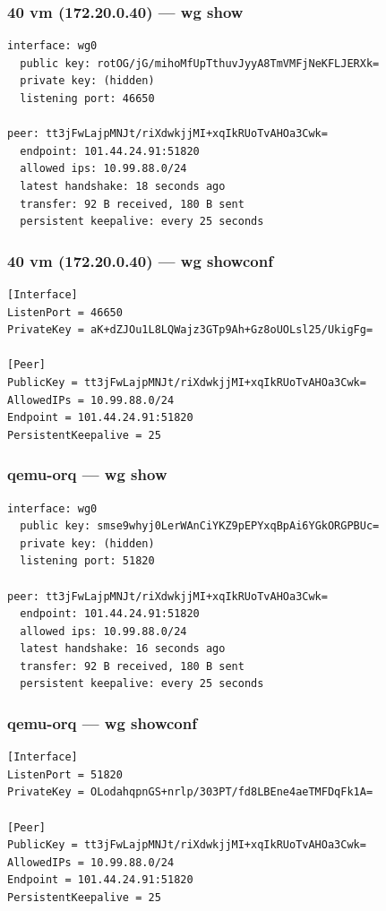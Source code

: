 \documentclass[11pt,a4paper]{article}
\begin{document}
\subsubsection*{40 vm (172.20.0.40) — wg show}
\begin{lstlisting}
interface: wg0
  public key: rotOG/jG/mihoMfUpTthuvJyyA8TmVMFjNeKFLJERXk=
  private key: (hidden)
  listening port: 46650

peer: tt3jFwLajpMNJt/riXdwkjjMI+xqIkRUoTvAHOa3Cwk=
  endpoint: 101.44.24.91:51820
  allowed ips: 10.99.88.0/24
  latest handshake: 18 seconds ago
  transfer: 92 B received, 180 B sent
  persistent keepalive: every 25 seconds

\end{lstlisting}

\subsubsection*{40 vm (172.20.0.40) — wg showconf}
\begin{lstlisting}
[Interface]
ListenPort = 46650
PrivateKey = aK+dZJOu1L8LQWajz3GTp9Ah+Gz8oUOLsl25/UkigFg=

[Peer]
PublicKey = tt3jFwLajpMNJt/riXdwkjjMI+xqIkRUoTvAHOa3Cwk=
AllowedIPs = 10.99.88.0/24
Endpoint = 101.44.24.91:51820
PersistentKeepalive = 25

\end{lstlisting}

\subsubsection*{qemu-orq — wg show}
\begin{lstlisting}
interface: wg0
  public key: smse9whyj0LerWAnCiYKZ9pEPYxqBpAi6YGkORGPBUc=
  private key: (hidden)
  listening port: 51820

peer: tt3jFwLajpMNJt/riXdwkjjMI+xqIkRUoTvAHOa3Cwk=
  endpoint: 101.44.24.91:51820
  allowed ips: 10.99.88.0/24
  latest handshake: 16 seconds ago
  transfer: 92 B received, 180 B sent
  persistent keepalive: every 25 seconds

\end{lstlisting}

\subsubsection*{qemu-orq — wg showconf}
\begin{lstlisting}
[Interface]
ListenPort = 51820
PrivateKey = OLodahqpnGS+nrlp/303PT/fd8LBEne4aeTMFDqFk1A=

[Peer]
PublicKey = tt3jFwLajpMNJt/riXdwkjjMI+xqIkRUoTvAHOa3Cwk=
AllowedIPs = 10.99.88.0/24
Endpoint = 101.44.24.91:51820
PersistentKeepalive = 25

\end{lstlisting}
\end{document}
